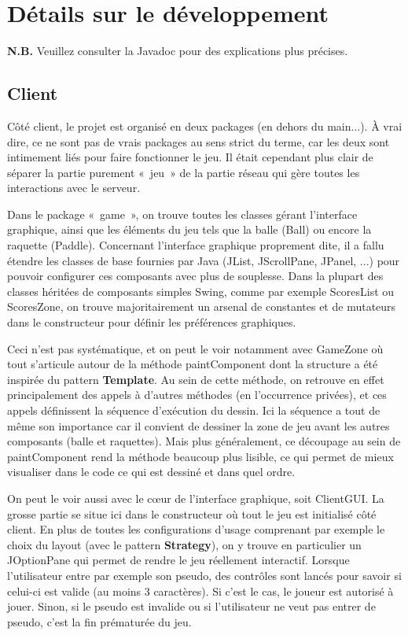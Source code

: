 \documentclass[a4paper,12pt]{article}
\begin{document}
\newpage

\section{Détails sur le développement}

\textbf{N.B.} Veuillez consulter la Javadoc pour des explications plus précises.

\subsection{Client}

Côté client, le projet est organisé en deux packages (en dehors du main...). À vrai dire, ce ne sont pas de vrais packages au sens strict du terme, car les deux sont intimement liés pour faire fonctionner le jeu. Il était cependant plus clair de séparer la partie purement «~jeu~» de la partie réseau qui gère toutes les interactions avec le serveur.

Dans le package «~game~», on trouve toutes les classes gérant l'interface graphique, ainsi que les éléments du jeu tels que la balle (Ball) ou encore la raquette (Paddle). Concernant l'interface graphique proprement dite, il a fallu étendre les classes de base fournies par Java (JList, JScrollPane, JPanel, ...) pour pouvoir configurer ces composants avec plus de souplesse. Dans la plupart des classes héritées de composants simples Swing, comme par exemple ScoresList ou ScoresZone, on trouve majoritairement un arsenal de constantes et de mutateurs dans le constructeur pour définir les préférences graphiques.

Ceci n'est pas systématique, et on peut le voir notamment avec GameZone où tout s'articule autour de la méthode paintComponent dont la structure a été inspirée du pattern \textbf{Template}. Au sein de cette méthode, on retrouve en effet principalement des appels à d'autres méthodes (en l'occurrence privées), et ces appels définissent la séquence d'exécution du dessin. Ici la séquence a tout de même son importance car il convient de dessiner la zone de jeu avant les autres composants (balle et raquettes). Mais plus généralement, ce découpage au sein de paintComponent rend la méthode beaucoup plus lisible, ce qui permet de mieux visualiser dans le code ce qui est dessiné et dans quel ordre.

On peut le voir aussi avec le cœur de l'interface graphique, soit ClientGUI. La grosse partie se situe ici dans le constructeur où tout le jeu est initialisé côté client. En plus de toutes les configurations d'usage comprenant par exemple le choix du layout (avec le pattern \textbf{Strategy}), on y trouve en particulier un JOptionPane qui permet de rendre le jeu réellement interactif. Lorsque l'utilisateur entre par exemple son pseudo, des contrôles sont lancés pour savoir si celui-ci est valide (au moins 3 caractères). Si c'est le cas, le joueur est autorisé à jouer. Sinon, si le pseudo est invalide ou si l'utilisateur ne veut pas entrer de pseudo, c'est la fin prématurée du jeu.
\end{document}
